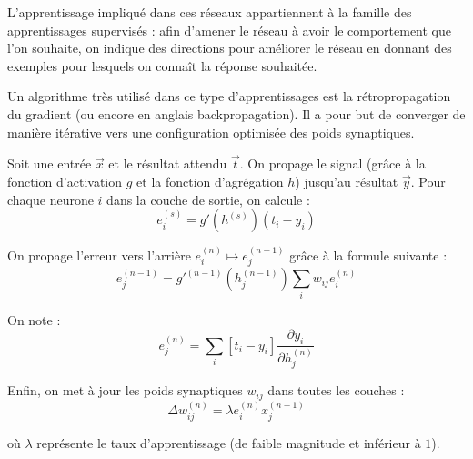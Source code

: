 L'apprentissage impliqu\'e dans ces r\'eseaux appartiennent \`a la famille des apprentissages supervis\'es : afin d'amener le r\'eseau \`a avoir le comportement que l'on souhaite, on indique des directions pour am\'eliorer le r\'eseau en donnant des exemples pour lesquels on conna\^it la r\'eponse souhait\'ee.

Un algorithme tr\`es utilis\'e dans ce type d'apprentissages est la r\'etropropagation du gradient (ou encore en anglais backpropagation). Il a pour but de converger de mani\`ere it\'erative vers une configuration optimis\'ee des poids synaptiques.

Soit une entr\'ee $\vec{x}$ et le r\'esultat attendu $\vec{t}$. On propage le signal (gr\^ace \`a la fonction d'activation $g$ et la fonction d'agr\'egation $h$) jusqu'au r\'esultat $\vec{y}$. Pour chaque neurone $i$ dans la couche de sortie, on calcule :
$$e_i^{(s)}=g'(h^{(s)})(t_i-y_i)$$

On propage l'erreur vers l'arri\`ere $e_i^{(n)} \mapsto e_j^{(n-1)}$ gr\^ace \`a la formule suivante :
$$e_j^{(n-1)} = g'^{(n-1)}(h_j^{(n-1)})\sum_i w_{ij}e_i^{(n)}$$

On note :
$$e_j^{(n)} = \sum_i [t_i - y_i] \frac{\partial y_i}{\partial h_j^{(n)}}$$

Enfin, on met \`a jour les poids synaptiques $w_{ij}$ dans toutes les couches :
$$\Delta w_{ij}^{(n)} = \lambda e_i^{(n)}x_j^{(n-1)}$$

o\`u $\lambda$ repr\'esente le taux d'apprentissage (de faible magnitude et inf\'erieur \`a $1$).